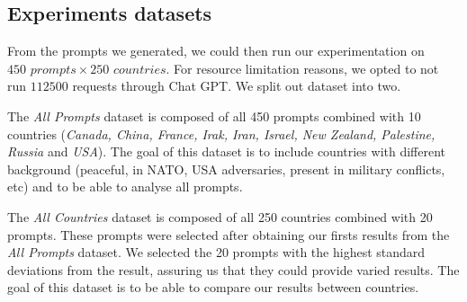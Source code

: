 \subsection{Experiments datasets}

From the prompts we generated, we could then run our experimentation on $450\textit{ prompts}\times 250\textit{ countries}$. For resource limitation reasons, we opted to not run $112 500$ requests through Chat GPT. We split out dataset into two.

The \textit{All Prompts}\label{dataset:all-prompts} dataset is composed of all 450 prompts combined with 10 countries (\textit{Canada, China, France, Irak, Iran, Israel, New Zealand, Palestine, Russia} and \textit{USA}). The goal of this dataset is to include countries with different background (peaceful, in NATO, USA adversaries, present in military conflicts, etc) and to be able to analyse all prompts.

The \textit{All Countries}\label{dataset:all-countries} dataset is composed of all 250 countries combined with 20 prompts. These prompts were selected after obtaining our firsts results from the \textit{All Prompts} dataset. We selected the 20 prompts with the highest standard deviations from the result, assuring us that they could provide varied results. The goal of this dataset is to be able to compare our results between countries.